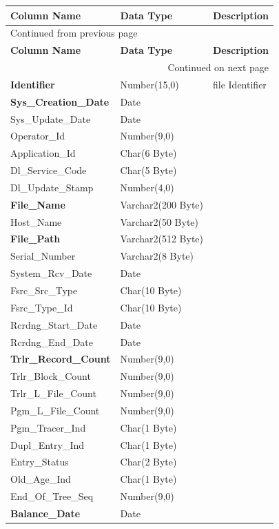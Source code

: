 \documentclass[12pt,twoside]{article}
\begin{document}
\begin{longtable}{l|l|l}
\hline
\textbf{Column Name} & \textbf{Data Type} & \textbf{Description}\\
\hline
\endfirsthead
\multicolumn{3}{l}{Continued from previous page} \\
\hline

\textbf{Column Name} & \textbf{Data Type} & \textbf{Description} \\

\hline
\endhead
\hline\multicolumn{3}{r}{Continued on next page} \\
\endfoot
\endlastfoot
\hline
\textbf{Identifier} & Number(15,0) & file Identifier\\
\textbf{Sys\_Creation\_Date} & Date & \\
Sys\_Update\_Date & Date & \\
Operator\_Id & Number(9,0) & \\
Application\_Id & Char(6 Byte) & \\
Dl\_Service\_Code & Char(5 Byte) & \\
Dl\_Update\_Stamp & Number(4,0) & \\
\textbf{File\_Name} & Varchar2(200 Byte) & \\
Host\_Name & Varchar2(50 Byte) & \\
\textbf{File\_Path} & Varchar2(512 Byte) & \\
Serial\_Number & Varchar2(8 Byte) & \\
System\_Rcv\_Date & Date & \\
Fsrc\_Src\_Type & Char(10 Byte) & \\
Fsrc\_Type\_Id & Char(10 Byte) & \\
Rcrdng\_Start\_Date & Date & \\
Rcrdng\_End\_Date & Date & \\
\textbf{Trlr\_Record\_Count} & Number(9,0) & \\
Trlr\_Block\_Count & Number(9,0) & \\
Trlr\_L\_File\_Count & Number(9,0) & \\
Pgm\_L\_File\_Count & Number(9,0) & \\
Pgm\_Tracer\_Ind & Char(1 Byte) & \\
Dupl\_Entry\_Ind & Char(1 Byte) & \\
Entry\_Status & Char(2 Byte) & \\
Old\_Age\_Ind & Char(1 Byte) & \\
End\_Of\_Tree\_Seq & Number(9,0) & \\
\textbf{Balance\_Date} & Date & \\
\hline
\end{longtable}
\normalsize
\end{document}
